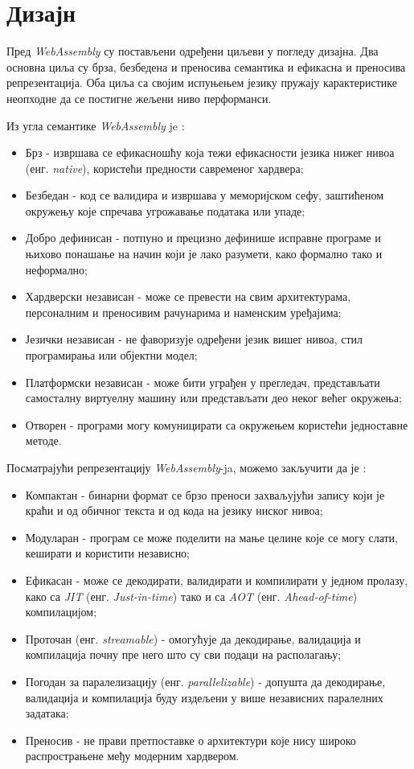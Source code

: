 \documentclass[12pt,oneside]{memoir}
\begin{document}
\section{Дизајн} \label{chp:DESIGN}

Пред \textit{WebAssembly} су постављени одређени циљеви у погледу дизајна. Два основна циља су брза, безбедена и
преносива семантика и ефикасна и преносива репрезентација. Оба циља са својим испуњењем језику пружају
карактеристике неопходне да се постигне жељени ниво перформанси.

Из угла семантике \textit{WebAssembly} je \cite{WASMS}:

\begin{itemize}
	\item Брз - извршава се ефикасношћу која тежи ефикасности језика нижег нивоа (енг. \textit{native}), користећи
	предности савременог хардвера;
	\item Безбедан - код се валидира и извршава у меморијском сефу, заштићеном окружењу које спречава угрожавање
	података или упаде;
	\item Добро дефинисан - потпуно и прецизно дефинише исправне програме и њихово понашање на начин који је лако
	разумети, како формално тако и неформално;
	\item Хардверски независан - може се превести на свим архитектурама, персоналним и преносивим рачунарима и
	наменским уређајима;
	\item Језички независан - не фаворизује одређени језик вишег нивоа, стил програмирања или објектни модел;
	\item Платформски независан - може бити уграђен у прегледач, представљати самосталну виртуелну машину или
	представљати део неког већег окружења;
	\item Отворен - програми могу комуницирати са окружењем користећи једноставне методе.
\end{itemize}
Посматрајући репрезентацију \textit{WebAssembly}-ja, можемо закључити да је \cite{WASMS}:

\begin{itemize}
	\item Компактан - бинарни формат се брзо преноси захваљујући запису који је краћи и од обичног текста и од кода
	на језику ниског нивоа;
	\item Модуларан - програм се може поделити на мање целине које се могу слати, кеширати и користити независно;
	\item Ефикасан - може се декодирати, валидирати и компилирати у једном пролазу, како са \textit{JIT} (енг. \textit{Just-in-time})
	тако и са \textit{AOT} (енг. \textit{Ahead-of-time}) компилацијом;
	\item Проточан (енг. \textit{streamable}) - омогућује да декодирање, валидација и компилација почну пре него
	што	су сви подаци на располагању;
	\item Погодан за паралелизацију (енг. \textit{parallelizable}) - допушта да декодирање, валидација и компилација буду
	издељени у више независних паралелних задатака;
	\item Преносив - не прави претпоставке о архитектури које нису широко распрострањене међу модерним хардвером.
\end{itemize}
\end{document}
